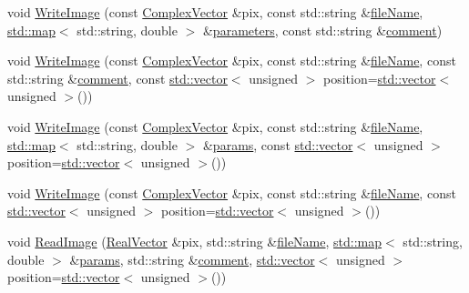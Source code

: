 \begin{DoxyCompactItemize}
\item 
void \hyperlink{class_q_s_t_e_m_1_1_c_image_i_o_ae3ef72bd1daa4e84ecb23857151127c1}{Write\-Image} (const \hyperlink{namespace_q_s_t_e_m_af210a2c1f9afae1deed746dcd9276221}{Complex\-Vector} \&pix, const std\-::string \&\hyperlink{qmb_8m_a7a230f02bdffebd1357e3c0b49e01271}{file\-Name}, \hyperlink{_displacement_params_8m_af619c74fd72bdb64d115463dff2720cd}{std\-::map}$<$ std\-::string, double $>$ \&\hyperlink{sim_image_from_wave_8m_acb6d7970e73c00effe1d16e23142f11d}{parameters}, const std\-::string \&\hyperlink{image_sim_8m_aea4cc4bd8e43a7f8ebf9b0ee3da8d681}{comment})
\item 
void \hyperlink{class_q_s_t_e_m_1_1_c_image_i_o_ab2db9eeb6ba489439c235b08f0536248}{Write\-Image} (const \hyperlink{namespace_q_s_t_e_m_af210a2c1f9afae1deed746dcd9276221}{Complex\-Vector} \&pix, const std\-::string \&\hyperlink{qmb_8m_a7a230f02bdffebd1357e3c0b49e01271}{file\-Name}, const std\-::string \&\hyperlink{image_sim_8m_aea4cc4bd8e43a7f8ebf9b0ee3da8d681}{comment}, const \hyperlink{qmb_8m_af54b69a32590de218622e869b06b47b3}{std\-::vector}$<$ unsigned $>$ position=\hyperlink{qmb_8m_af54b69a32590de218622e869b06b47b3}{std\-::vector}$<$ unsigned $>$())
\item 
void \hyperlink{class_q_s_t_e_m_1_1_c_image_i_o_a2ad03a0aca2522cd9ef351061e6e3cb0}{Write\-Image} (const \hyperlink{namespace_q_s_t_e_m_af210a2c1f9afae1deed746dcd9276221}{Complex\-Vector} \&pix, const std\-::string \&\hyperlink{qmb_8m_a7a230f02bdffebd1357e3c0b49e01271}{file\-Name}, \hyperlink{_displacement_params_8m_af619c74fd72bdb64d115463dff2720cd}{std\-::map}$<$ std\-::string, double $>$ \&\hyperlink{image_sim_8m_ad57b218fb254a1624c09ad71cb6b6415}{params}, const \hyperlink{qmb_8m_af54b69a32590de218622e869b06b47b3}{std\-::vector}$<$ unsigned $>$ position=\hyperlink{qmb_8m_af54b69a32590de218622e869b06b47b3}{std\-::vector}$<$ unsigned $>$())
\item 
void \hyperlink{class_q_s_t_e_m_1_1_c_image_i_o_aa7d16d3d2a96f946f0f0050a5b24a3b6}{Write\-Image} (const \hyperlink{namespace_q_s_t_e_m_af210a2c1f9afae1deed746dcd9276221}{Complex\-Vector} \&pix, const std\-::string \&\hyperlink{qmb_8m_a7a230f02bdffebd1357e3c0b49e01271}{file\-Name}, const \hyperlink{qmb_8m_af54b69a32590de218622e869b06b47b3}{std\-::vector}$<$ unsigned $>$ position=\hyperlink{qmb_8m_af54b69a32590de218622e869b06b47b3}{std\-::vector}$<$ unsigned $>$())
\item 
void \hyperlink{class_q_s_t_e_m_1_1_c_image_i_o_afeb5053997a7ee3d0949c28fb5c0a6ad}{Read\-Image} (\hyperlink{namespace_q_s_t_e_m_a8dfe9e1dbecce3838cb082d96e991ba7}{Real\-Vector} \&pix, std\-::string \&\hyperlink{qmb_8m_a7a230f02bdffebd1357e3c0b49e01271}{file\-Name}, \hyperlink{_displacement_params_8m_af619c74fd72bdb64d115463dff2720cd}{std\-::map}$<$ std\-::string, double $>$ \&\hyperlink{image_sim_8m_ad57b218fb254a1624c09ad71cb6b6415}{params}, std\-::string \&\hyperlink{image_sim_8m_aea4cc4bd8e43a7f8ebf9b0ee3da8d681}{comment}, \hyperlink{qmb_8m_af54b69a32590de218622e869b06b47b3}{std\-::vector}$<$ unsigned $>$ position=\hyperlink{qmb_8m_af54b69a32590de218622e869b06b47b3}{std\-::vector}$<$ unsigned $>$())

\end{DoxyCompactItemize}

